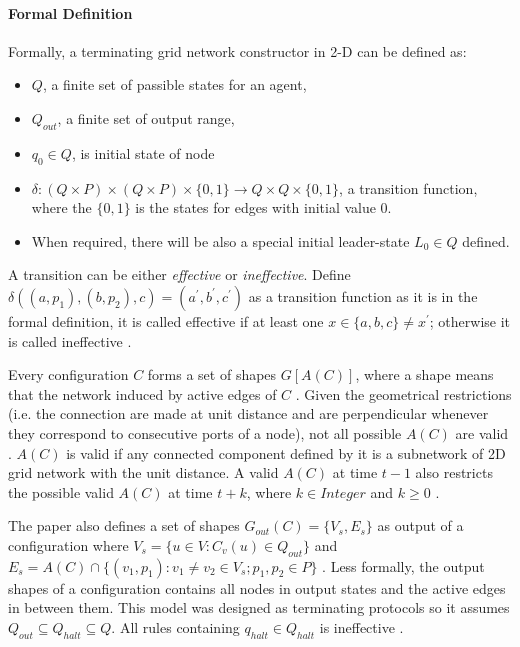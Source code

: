 \paragraph{Formal Definition \cite{Mi17} }
Formally, a terminating grid network constructor in 2-D can be defined as:
\begin{itemize}
  \item $Q$, a finite set of passible states for an agent,
  \item $Q_{out}$, a finite set of output range,
  \item $q_{0} \in Q $, is initial state of node
  \item $\delta: (Q \times P ) \times (Q \times P) \times \{0,1\} \to Q \times Q \times \{0,1\}$, a transition function, where the $\{0,1\}$ is the states for edges with initial value 0.
  \item When required, there will be also a special initial leader-state $L_{0} \in Q $ defined.
\end{itemize}

\par\noindent
A transition can be either \textit{effective}
or \textit{ineffective}. Define $\delta((a, p_{1}), (b, p_{2}), c) = (a^{'}, b^{'},c^{'})$ as a transition function
as it is in the formal definition, it is called effective if at least one $x \in \{a,b,c\} \not= x^{'} $; otherwise it is called ineffective \cite{Mi17}.


\par\noindent
Every configuration $C$ forms a set of shapes $G[A(C)]$, where a shape means that the network induced
by active edges of $C$ \cite{Mi17}. Given the geometrical restrictions (i.e. the connection are
made at unit distance and are perpendicular whenever they correspond to consecutive ports of a node),
not all possible $A(C)$ are valid \cite{Mi17}. $A(C)$ is valid if any connected component defined by it is a
subnetwork of 2D grid network with the unit distance. A valid $A(C)$ at time $t -1$ also restricts the
possible valid $A(C)$ at time $t + k$, where $k \in Integer$ and $k \geq 0 $ \cite{Mi17}.


\par\noindent
The paper \cite{Mi17} also defines a set of
shapes $G_{out}(C) = \{V_{s}, E_{s}\}$ as output of a configuration where $V_{s} = \{u \in V : C_{v}(u) \in Q_{out} \}$
and $E_{s} = A(C) \cap \{ (v_{1}, p_{1}) : v_{1} \not= v_{2} \in V_{s}; p_{1}, p_{2} \in P \}$ \cite{Mi17}.
Less formally, the output shapes of a configuration contains all nodes in output states and the active edges in between them.
This model was designed as terminating protocols so it assumes $Q_{out} \subseteq Q_{halt} \subseteq Q $.
All rules containing $q_{halt} \in Q_{halt} $ is ineffective \cite{Mi17}.

